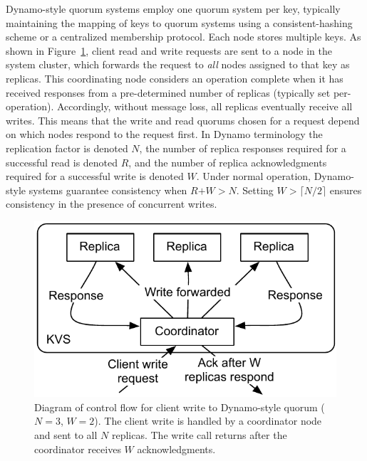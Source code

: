 \documentclass{vldb}
\begin{document}
Dynamo-style quorum systems employ one quorum system per key,
typically maintaining the mapping of keys to quorum systems using a
consistent-hashing scheme or a centralized membership protocol. Each
node stores multiple keys.  As shown in
Figure~\ref{fig:dynamo-quorum}, client read and write requests are
sent to a node in the system cluster, which forwards the request to
\textit{all} nodes assigned to that key as replicas.  This
coordinating node considers an operation complete when it has received
responses from a pre-determined number of replicas (typically set
per-operation).  Accordingly, without message loss, all replicas
eventually receive all writes.  This means that the write and read
quorums chosen for a request depend on which nodes respond to the
request first.  In Dynamo terminology the replication factor is
denoted $N$, the number of replica responses required for a successful
read is denoted $R$, and the number of replica acknowledgments
required for a successful write is denoted $W$. Under normal
operation, Dynamo-style systems guarantee consistency when
$R$$+$$W$$>$$N$.  Setting $W$$>$$\lceil$$N/2$$\rceil$ ensures
consistency in the presence of concurrent writes.

\begin{figure}
\centering
\includegraphics[width=.85\columnwidth]{figs/dynamo-quorum.pdf}
\vspace{-8pt}
\caption{Diagram of control flow for client write to Dynamo-style
  quorum ($N=3$, $W=2$).  The client write is handled by a
  coordinator node and sent to all $N$ replicas. The write call returns
  after the coordinator receives $W$ acknowledgments.}
\vspace{-12pt}
\label{fig:dynamo-quorum}
\end{figure}
\end{document}
